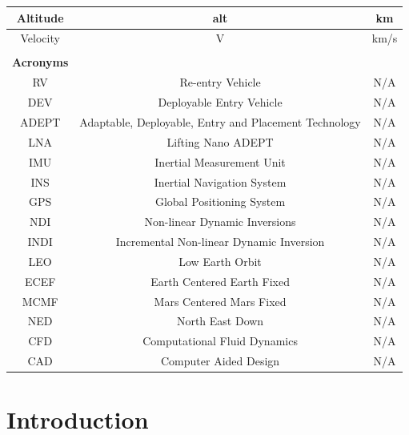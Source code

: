 \documentclass[12pt]{article}
\numberwithin{equation}{section}
\numberwithin{figure}{section}
\numberwithin{table}{section}
\begin{document}
\begin{center}
\begin{tabular}{|c|c|c|}
\hline
Altitude & alt & km\\
\hline
Velocity & V & km/s\\
\hline
& &\\
\hline
\textbf{Acronyms} & &\\
\hline
RV & Re-entry Vehicle & N/A\\
\hline
DEV & Deployable Entry Vehicle & N/A\\
\hline
ADEPT & Adaptable, Deployable, Entry and Placement Technology & N/A\\
\hline
LNA & Lifting Nano ADEPT & N/A\\
\hline
IMU & Inertial Measurement Unit & N/A\\
\hline
INS & Inertial Navigation System & N/A\\
\hline
GPS & Global Positioning System & N/A\\
\hline
NDI & Non-linear Dynamic Inversions & N/A\\
\hline
INDI & Incremental Non-linear Dynamic Inversion & N/A\\
\hline
LEO & Low Earth Orbit & N/A\\
\hline
ECEF & Earth Centered Earth Fixed & N/A\\
\hline
MCMF & Mars Centered Mars Fixed & N/A\\
\hline
NED & North East Down & N/A\\
\hline
CFD & Computational Fluid Dynamics & N/A\\
\hline
CAD & Computer Aided Design & N/A\\
\hline
\end{tabular}
\end{center}
\vfill

\newpage
\setcounter{page}{1}

\section{Introduction}
\end{document}

